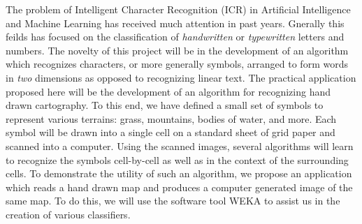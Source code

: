 The problem of Intelligent Character Recognition (ICR) in Artificial
Intelligence and Machine Learning has received much attention in past years.
Gnerally this feilds has focused on the classification of
\emph{handwritten}  or \emph{typewritten} letters and numbers.  The novelty of
this project will be in the development of an algorithm which recognizes
characters, or more generally symbols, arranged to form words in \emph{two}
dimensions as opposed to recognizing linear text. The practical application
proposed here will be the development of an algorithm for recognizing hand
drawn cartography. To this end, we have defined a small set of symbols to
represent various terrains: grass, mountains, bodies of water, and more. Each
symbol will be drawn into a single cell on a standard sheet of grid paper and
scanned into a computer. Using the scanned images, several algorithms will
learn to recognize the symbols cell-by-cell as well as in the context of the
surrounding cells. To demonstrate the utility of such an algorithm, we
propose an application which reads a hand drawn map and produces a computer
generated image of the same map. To do this, we will use the software tool
WEKA\cite{hall2009} to assist us in the creation of various classifiers.

